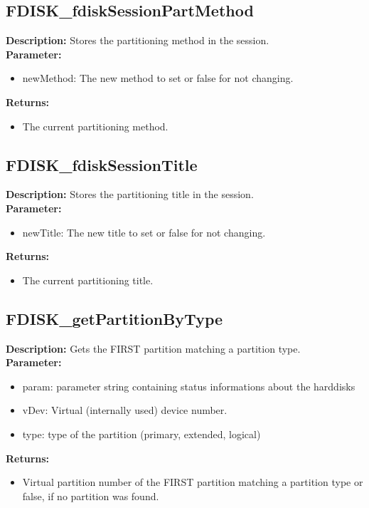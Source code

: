 \subsection{FDISK\_fdiskSessionPartMethod}
\textbf{Description:} Stores the partitioning method in the session.\\
\textbf{Parameter:}
\begin{itemize}
\item newMethod: The new method to set or false for not changing.
\end{itemize}
\textbf{Returns:}
\begin{itemize}
\item The current partitioning method.
\end{itemize}

\subsection{FDISK\_fdiskSessionTitle}
\textbf{Description:} Stores the partitioning title in the session.\\
\textbf{Parameter:}
\begin{itemize}
\item newTitle: The new title to set or false for not changing.
\end{itemize}
\textbf{Returns:}
\begin{itemize}
\item The current partitioning title.
\end{itemize}

\subsection{FDISK\_getPartitionByType}
\textbf{Description:} Gets the FIRST partition matching a partition type.\\
\textbf{Parameter:}
\begin{itemize}
\item param: parameter string containing status informations about the harddisks
\item vDev: Virtual (internally used) device number.
\item type: type of the partition (primary, extended, logical)
\end{itemize}
\textbf{Returns:}
\begin{itemize}
\item Virtual partition number of the FIRST partition matching a partition type or false, if no partition was found.
\end{itemize}

